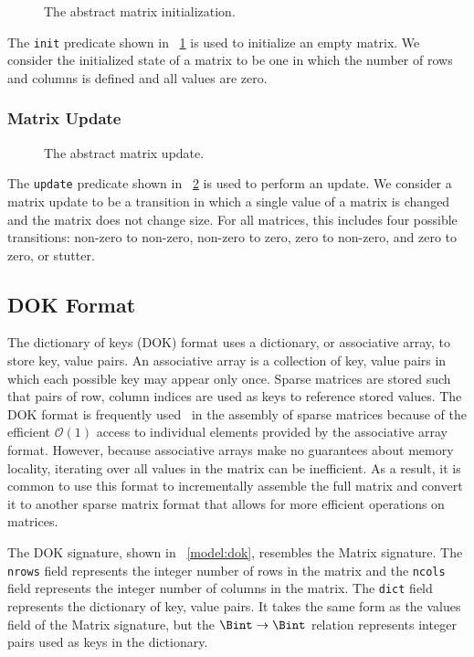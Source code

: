 \begin{figure}
\centering

\caption{The abstract matrix initialization.}
\label{init:abstract}
\end{figure}

The \texttt{init} predicate shown in \figurename~\ref{init:abstract} is used to initialize an empty matrix.  We consider the initialized state of a matrix to be one in which the number of rows and columns is defined and all values are zero.

\subsubsection{Matrix Update}

\begin{figure}
\centering

\caption{The abstract matrix update.}
\label{update:abstract}
\end{figure}

The \texttt{update} predicate shown in \figurename~\ref{update:abstract} is used to perform an update.  We consider a matrix update to be a transition in which a single value of a matrix is changed and the matrix does not change size.  For all matrices, this includes four possible transitions: non-zero to non-zero, non-zero to zero, zero to non-zero, and zero to zero, or stutter.

\subsection{DOK Format}

The dictionary of keys (DOK) format uses a dictionary, or associative array, to store key, value pairs.  An associative array is a collection of key, value pairs in which each possible key may appear only once.  Sparse matrices are stored such that pairs of row, column indices are used as keys to reference stored values.  The DOK format is frequently used~\cite{scipy, eigenweb2010} in the assembly of sparse matrices because of the efficient \(\mathcal{O}(1)\) access to individual elements provided by the associative array format.  However, because associative arrays make no guarantees about memory locality, iterating over all values in the matrix can be inefficient.  As a result, it is common to use this format to incrementally assemble the full matrix and convert it to another sparse matrix format that allows for more efficient operations on matrices.

The DOK signature, shown in \figurename~\ref{model:dok}, resembles the Matrix signature.  The \texttt{nrows} field represents the integer number of rows in the matrix and the \texttt{ncols} field represents the integer number of columns in the matrix.  The \texttt{dict} field represents the dictionary of key, value pairs.  It takes the same form as the values field of the Matrix signature, but the \(\Bint \to \Bint\) relation represents integer pairs used as keys in the dictionary.

